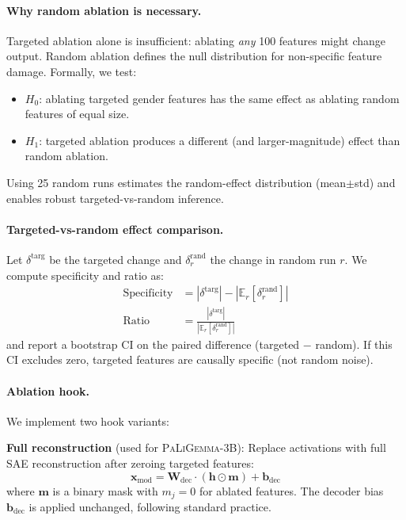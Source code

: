 \documentclass[11pt,a4paper]{article}
\newcommand{\modelname}[1]{\textsc{#1}}
\newcommand{\pali}{\modelname{PaLiGemma-3B}}
\newcommand{\sae}{SAE}
\begin{document}
\paragraph{Why random ablation is necessary.}
Targeted ablation alone is insufficient: ablating \emph{any} 100 features might change output.
Random ablation defines the null distribution for non-specific feature damage.
Formally, we test:
\begin{itemize}
    \item $H_0$: ablating targeted gender features has the same effect as ablating random features of equal size.
    \item $H_1$: targeted ablation produces a different (and larger-magnitude) effect than random ablation.
\end{itemize}
Using 25 random runs estimates the random-effect distribution (mean$\pm$std) and enables robust targeted-vs-random inference.

\paragraph{Targeted-vs-random effect comparison.}
Let $\delta^{\text{targ}}$ be the targeted change and $\delta_r^{\text{rand}}$ the change in random run $r$.
We compute specificity and ratio as:
\begin{align}
\text{Specificity} &= |\delta^{\text{targ}}| - |\mathbb{E}_r[\delta_r^{\text{rand}}]| \\
\text{Ratio} &= \frac{|\delta^{\text{targ}}|}{|\mathbb{E}_r[\delta_r^{\text{rand}}]|}
\end{align}
and report a bootstrap CI on the paired difference (targeted $-$ random).
If this CI excludes zero, targeted features are causally specific (not random noise).

\paragraph{Ablation hook.}
We implement two hook variants:

\textbf{Full reconstruction} (used for \pali{}): Replace activations with full \sae{} reconstruction after zeroing targeted features:
\begin{equation}
    \mathbf{x}_{\text{mod}} = \mathbf{W}_{\text{dec}} \cdot (\mathbf{h} \odot \mathbf{m}) + \mathbf{b}_{\text{dec}}
\end{equation}
where $\mathbf{m}$ is a binary mask with $m_j = 0$ for ablated features.
The decoder bias $\mathbf{b}_{\text{dec}}$ is applied unchanged, following standard practice.
\end{document}
